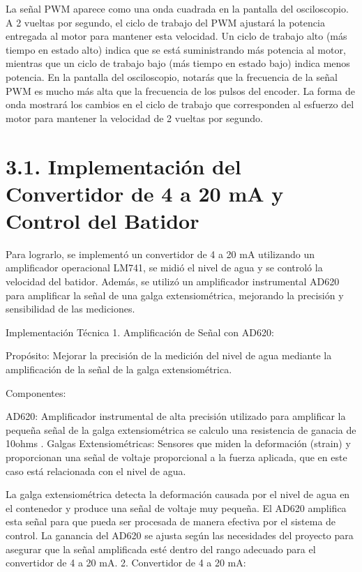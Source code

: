 \documentclass[esp]{ECCI-SIME-class}
\begin{document}
La señal PWM aparece como una onda cuadrada en la pantalla del osciloscopio. A 2 vueltas por segundo, el ciclo de trabajo del PWM ajustará la potencia entregada al motor para mantener esta velocidad.
Un ciclo de trabajo alto (más tiempo en estado alto) indica que se está suministrando más potencia al motor, mientras que un ciclo de trabajo bajo (más tiempo en estado bajo) indica menos potencia.
En la pantalla del osciloscopio, notarás que la frecuencia de la señal PWM es mucho más alta que la frecuencia de los pulsos del encoder. La forma de onda mostrará los cambios en el ciclo de trabajo que corresponden al esfuerzo del motor para mantener la velocidad de 2 vueltas por segundo.




\section{3.1.  Implementación del Convertidor de 4 a 20 mA y Control del Batidor}


Para lograrlo, se implementó un convertidor de 4 a 20 mA utilizando un amplificador operacional LM741, se midió el nivel de agua y se controló la velocidad del batidor. Además, se utilizó un amplificador instrumental AD620 para amplificar la señal de una galga extensiométrica, mejorando la precisión y sensibilidad de las mediciones.

Implementación Técnica
1. Amplificación de Señal con AD620:

Propósito: Mejorar la precisión de la medición del nivel de agua mediante la amplificación de la señal de la galga extensiométrica.

Componentes:

AD620: Amplificador instrumental de alta precisión utilizado para amplificar la pequeña señal de la galga extensiométrica se calculo una resistencia de ganacia de 10ohms .
Galgas Extensiométricas: Sensores que miden la deformación (strain) y proporcionan una señal de voltaje proporcional a la fuerza aplicada, que en este caso está relacionada con el nivel de agua. 

La galga extensiométrica detecta la deformación causada por el nivel de agua en el contenedor y produce una señal de voltaje muy pequeña.
El AD620 amplifica esta señal para que pueda ser procesada de manera efectiva por el sistema de control.
La ganancia del AD620 se ajusta según las necesidades del proyecto para asegurar que la señal amplificada esté dentro del rango adecuado para el convertidor de 4 a 20 mA.
2. Convertidor de 4 a 20 mA:
\end{document}
